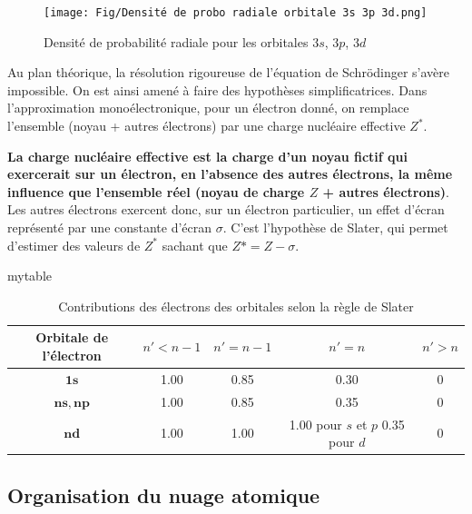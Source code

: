 \documentclass{article}
\begin{document}
\begin{figure}[ht]
    \centering
    \texttt{[image: Fig/Densité de probo radiale orbitale 3s 3p 3d.png]}
    \caption{Densité de probabilité radiale pour les orbitales $3s$, $3p$, $3d$}
    \label{fig:Densité de probo radiale orbitale 3s 3p 3d}
\end{figure}

Au plan théorique, la résolution rigoureuse de l'équation de Schrödinger s'avère impossible. On est ainsi amené à faire des hypothèses simplificatrices. Dans l'approximation monoélectronique, pour un électron donné, on remplace l'ensemble (noyau + autres électrons) par une charge nucléaire effective $Z^*$. 

\textbf{La charge nucléaire effective est la charge d'un noyau fictif qui exercerait sur un électron, en l'absence des autres électrons, la même influence que l'ensemble réel (noyau de charge $Z$ + autres électrons)}. Les autres électrons exercent donc, sur un électron particulier, un effet d'écran représenté par une constante d'écran $\sigma$. C'est l'hypothèse de Slater, qui permet d'estimer des valeurs de $Z^*$ sachant que $Z* = Z - \sigma$.

\begin{collect*}{mytable}{\setcounter{duptable}{\value{table}}}{}{}{}
\begin{table}[h]
    \centering
    \begin{tabular}{|c|c|c|c|c|}
     \hline
        \textbf{Orbitale de l'électron} & $n'<n-1$ & $n'=n-1$ & $n'=n$ & $n'>n$ \\ \hline
        $\bm{1s}$ & 1.00 & 0.85 & 0.30 & 0 \\ \hline
        $\bm{ns, np}$ & 1.00 &  0.85 & 0.35 & 0 \\ \hline
        $\bm{nd}$ & 1.00 & 1.00 & \makecell{1.00 pour $s$ et $p$ \\ 0.35 pour $d$} & 0 \\ \hline
    \end{tabular}
    \caption{Contributions des électrons des orbitales selon la règle de Slater}
    \label{tab:Contributions des électrons des orbitales selon la règle de Slater}
\end{table}
\end{collect*}

\subsection{Organisation du nuage atomique}
\end{document}
